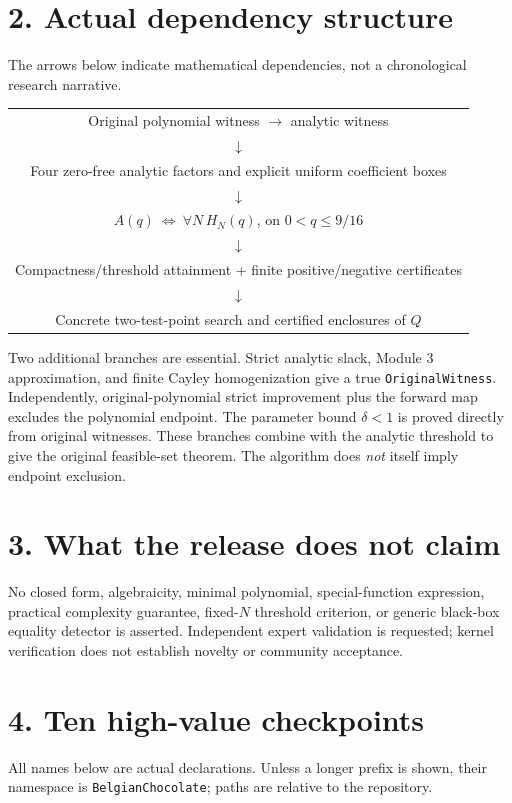 \documentclass[10pt,a4paper]{article}
\newcommand{\itemhead}[2]{\par\medskip\textbf{#1. #2}\par}
\begin{document}
\section*{2. Actual dependency structure}
The arrows below indicate mathematical dependencies, not a chronological
research narrative.
\begin{center}\small
\begin{tabular}{c}
Original polynomial witness $\longrightarrow$ analytic witness\\
$\downarrow$\\
Four zero-free analytic factors and explicit uniform coefficient boxes\\
$\downarrow$\\
$A(q)\ \Longleftrightarrow\ \forall N\,H_N(q)$, on $0<q\le9/16$\\
$\downarrow$\\
Compactness/threshold attainment + finite positive/negative certificates\\
$\downarrow$\\
Concrete two-test-point search and certified enclosures of $Q$
\end{tabular}
\end{center}
Two additional branches are essential. Strict analytic slack, Module 3
approximation, and finite Cayley homogenization give a true
\texttt{OriginalWitness}. Independently, original-polynomial strict
improvement plus the forward map excludes the polynomial endpoint.
The parameter bound $\delta<1$ is proved directly from original witnesses.
These branches combine with the analytic threshold to give the original
feasible-set theorem. The algorithm does \emph{not} itself imply endpoint
exclusion.

\section*{3. What the release does not claim}
No closed form, algebraicity, minimal polynomial, special-function expression,
practical complexity guarantee, fixed-$N$ threshold criterion, or generic
black-box equality detector is asserted. Independent expert validation is
requested; kernel verification does not establish novelty or community acceptance.

\newpage
\begingroup\small\raggedright
\setlength{\parskip}{2pt}
\renewcommand{\itemhead}[2]{\par\smallskip\textbf{#1. #2}\par}
\section*{4. Ten high-value checkpoints}
All names below are actual declarations. Unless a longer prefix is shown,
their namespace is \texttt{BelgianChocolate}; paths are relative to the repository.
\end{document}
